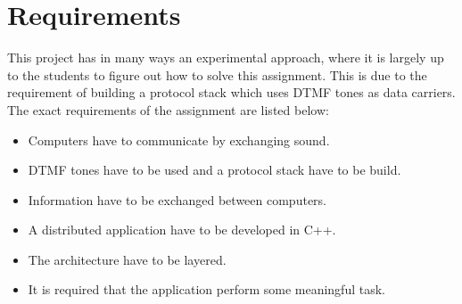 \section{Requirements}
This project has in many ways an experimental approach, where it is largely up to the students to figure out how to solve this assignment. This is due to the requirement of building a protocol stack which uses DTMF tones as data carriers. The exact requirements of the assignment are listed below:

\begin{itemize}
\item Computers have to communicate by exchanging sound.
\item DTMF tones have to be used and a protocol stack have to be build.
\item Information have to be exchanged between computers.
\item A distributed application have to be developed in C++.
\item The architecture have to be layered.
\item It is required that the application perform some meaningful task.
\end{itemize}